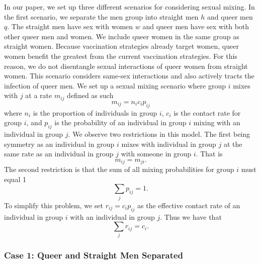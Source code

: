 \documentclass[12pt]{article}
\begin{document}
In our paper, we set up three different scenarios for considering sexual mixing. In the first scenario, we separate the men group into straight men $h$ and queer men $q$. The straight men have sex with women $w$ and queer men have sex with both other queer men and women.  We include queer women in the same group as straight women. Because vaccination strategies already target women, queer women benefit the greatest from the current vaccination strategies.  For this reason, we do not disentangle sexual interactions of queer women from straight women.  This scenario considers same-sex interactions and also actively tracts the infection of queer men.  We set up a sexual mixing scenario where group $i$ mixes with $j$ at a rate $m_{ij}$ defined as such
\begin{equation}
m_{ij} = n_ic_i p_{ij}
\end{equation}
where $n_i$ is the proportion of individuals in group $i$, $c_i$ is the contact rate for group $i$, and $p_{ij}$ is the probability of an individual in group $i$ mixing with an individual in group $j$.  We observe two restrictions in this model.  The first being symmetry as an individual in group $i$ mixes with individual in group $j$ at the same rate as an individual in group $j$ with someone in group $i$. That is
\begin{equation}
m_{ij}=m_{ji}.
\end{equation}
The second restriction is that the sum of all mixing probabilities for group $i$ must equal 1
\begin{equation}
\sum_j p_{ij} = 1.
\end{equation}
To simplify this problem, we set $r_{ij}=c_ip_{ij}$ as the effective contact rate of an individual in group $i$ with an individual in group $j$.  Thus we have that 
\begin{equation}
\sum_j r_{ij} = c_i.
\end{equation}

\subsubsection{Case 1: Queer and Straight Men Separated}
\end{document}
